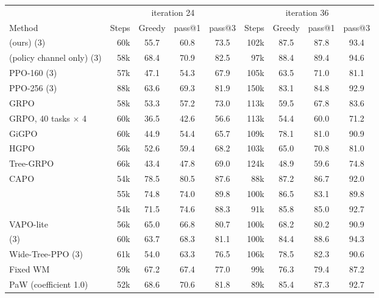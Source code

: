 \begin{tabular}{l r c c c r c c c }
\toprule
 & \multicolumn{4}{c}{iteration 24} & \multicolumn{4}{c}{iteration 36} \\
\cmidrule(lr){2-5}\cmidrule(lr){6-9}
Method & Steps & Greedy & pass@1 & pass@3 & Steps & Greedy & pass@1 & pass@3 \\
\midrule
\wmppo{} (ours) (3) & 60k & 55.7 & 60.8 & 73.5 & 102k & 87.5 & 87.8 & 93.4 \\
\wmppo{} (policy channel only) (3) & 58k & 68.4\sigdn{} & 70.9\sigdn{} & 82.5 & 97k & 88.4 & 89.4 & 94.6 \\
PPO-160 (3) & 57k & 47.1\sigup{} & 54.3\sigup{} & 67.9 & 105k & 63.5\sigup{} & 71.0\sigup{} & 81.1 \\
PPO-256 (3) & 88k & 63.6\sigdn{} & 69.3\sigdn{} & 81.9 & 150k & 83.1\sigup{} & 84.8\sigup{} & 92.9 \\
GRPO & 58k & 53.3 & 57.2\sigup{} & 73.0 & 113k & 59.5\sigup{} & 67.8\sigup{} & 83.6 \\
GRPO, 40 tasks $\times$ 4 & 60k & 36.5\sigup{} & 42.6\sigup{} & 56.6 & 113k & 54.4\sigup{} & 60.0\sigup{} & 71.2 \\
GiGPO & 60k & 44.9\sigup{} & 54.4\sigup{} & 65.7 & 109k & 78.1\sigup{} & 81.0\sigup{} & 90.9 \\
HGPO & 56k & 52.6 & 59.4 & 68.2 & 103k & 65.0\sigup{} & 70.8\sigup{} & 81.0 \\
Tree-GRPO & 66k & 43.4\sigup{} & 47.8\sigup{} & 69.0 & 124k & 48.9\sigup{} & 59.6\sigup{} & 74.8 \\
CAPO & 54k & 78.5\sigdn{} & 80.5\sigdn{} & 87.6 & 88k & 87.2 & 86.7 & 92.0 \\
\sopo{} & 55k & 74.8\sigdn{} & 74.0\sigdn{} & 89.8 & 100k & 86.5 & 83.1\sigup{} & 89.8 \\
\steppo{} & 54k & 71.5\sigdn{} & 74.6\sigdn{} & 88.3 & 91k & 85.8 & 85.0 & 92.7 \\
VAPO-lite & 56k & 65.0\sigdn{} & 66.8\sigdn{} & 80.7 & 100k & 68.2\sigup{} & 80.2\sigup{} & 90.9 \\
\qppo{} (3) & 60k & 63.7\sigdn{} & 68.3\sigdn{} & 81.1 & 100k & 84.4\sigup{} & 88.6 & 94.3 \\
Wide-Tree-PPO (3) & 61k & 54.0 & 63.3\sigdn{} & 76.5 & 106k & 78.5\sigup{} & 82.3\sigup{} & 90.6 \\
Fixed WM & 59k & 67.2\sigdn{} & 67.4\sigdn{} & 77.0 & 99k & 76.3\sigup{} & 79.4\sigup{} & 87.2 \\
PaW (coefficient 1.0) & 52k & 68.6\sigdn{} & 70.6\sigdn{} & 81.8 & 89k & 85.4 & 87.3 & 92.7 \\

\end{tabular}
